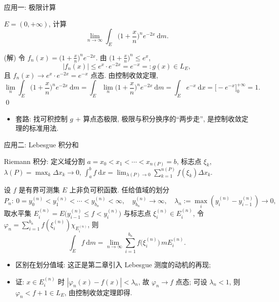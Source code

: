 
\begin{frame}{应用一: 极限计算}

\begin{eg}
$E = (0, +\infty)$, 计算
\[
\lim_{n \to \infty} \int_E \Big( 1 + \frac{x}{n} \Big)^n e^{-2x} ~ \mathrm{d} m .
\]
\end{eg}

\startproof[bg=yellow, fg=red](解)
令 $f_n(x) = \big( 1 + \tfrac{x}{n} \big)^n e^{-2x}$. 由 $\big( 1 + \tfrac{x}{n} \big)^n \leqslant e^x$,
\[
|f_n(x)| \leqslant e^x \cdot e^{-2x} = e^{-x} =: g(x) \in L_E ,
\]
且 $f_n(x) \to e^x \cdot e^{-2x} = e^{-x}$ 点态. 由控制收敛定理,
\[
\lim_{n} \int_E \Big( 1 + \frac{x}{n} \Big)^n e^{-2x} ~ \mathrm{d} m
= \int_E \lim_n \Big( 1 + \frac{x}{n} \Big)^n e^{-2x} ~ \mathrm{d} m
= \int_E e^{-x} ~ \mathrm{d} x = \big[ -e^{-x} \big]_0^{+\infty} = 1 .
\]
\qed

\pause

\begin{itemize}
\item 套路: 找\alert{可积控制} $g$ + 算\alert{点态极限},
  极限与积分换序的``两步走'', 是控制收敛定理的标准用法.
\end{itemize}

\end{frame}


\begin{frame}{应用二: Lebesgue 积分和}

Riemann 积分: \alert{定义域}分割 $a = x_0 < x_1 < \cdots < x_{n(P)} = b$, 标志点 $\xi_k$,
$\lambda(P) = \max_k \Delta x_k \to 0$,
$\int_a^b f ~ \mathrm{d}x = \lim_{\lambda(P) \to 0} \sum_{k=1}^{n(P)} f(\xi_k) \Delta x_k$.

\pause

\begin{thm}[积分和]
设 $f$ 是有界可测集 $E$ 上\alert{非负}可积函数. 任给\alert{值域}的划分
\[
P_n:\ 0 = y_0^{(n)} < y_1^{(n)} < \cdots < y_{b_n}^{(n)} < \infty,
\quad y_{b_n}^{(n)} \to \infty,\quad
\lambda_n := \max_i (y_i^{(n)} - y_{i-1}^{(n)}) \to 0 ,
\]
取水平集 $E_i^{(n)} = E\big( y_{i-1}^{(n)} \leqslant f < y_i^{(n)} \big)$ 与标志点
$\xi_i^{(n)} \in E_i^{(n)}$, 令 $\varphi_n = \sum_{i=1}^{b_n} f(\xi_i^{(n)}) \chi_{E_i^{(n)}}$, 则
\[
\int_E f ~ \mathrm{d} m = \lim_{n \to \infty} \sum_{i=1}^{b_n} f\big( \xi_i^{(n)} \big)\, m E_i^{(n)} .
\]
\end{thm}

\pause

\begin{itemize}
\item 区别在\alert{划分值域}: 这正是第二章引入 Lebesgue 测度的动机的再现;
\item 证: $x \in E_i^{(n)}$ 时 $|\varphi_n(x) - f(x)| < \lambda_n$, 故 $\varphi_n \to f$ 点态;
  可设 $\lambda_n < 1$, 则 $\varphi_n < f + 1 \in L_E$, 由控制收敛定理即得.
\end{itemize}

\end{frame}

